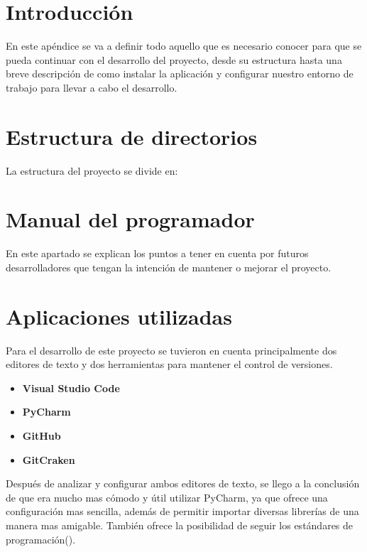 
\section{Introducción}
En este apéndice se va a definir todo aquello que es necesario conocer para que se pueda continuar con el desarrollo del proyecto, desde su estructura hasta una breve descripción de como instalar la aplicación y configurar nuestro entorno de trabajo para llevar a cabo el desarrollo.

\section{Estructura de directorios}
La estructura del proyecto se divide en:

\section{Manual del programador}
En este apartado se explican los puntos a tener en cuenta por futuros desarrolladores que tengan la intención de mantener o mejorar el proyecto.

\section{Aplicaciones utilizadas}
Para el desarrollo de este proyecto se tuvieron en cuenta principalmente dos editores de texto y dos herramientas para mantener el control de versiones.

\begin{itemize}
	\item \textbf{Visual Studio Code} 
	\item \textbf{PyCharm}
	\item \textbf{GitHub}
	\item \textbf{GitCraken}
\end{itemize}
Después de analizar y configurar ambos editores de texto, se llego a la conclusión de que era mucho mas cómodo y útil utilizar PyCharm, ya que ofrece una configuración mas sencilla, además de permitir importar diversas librerías de una manera mas amigable. También ofrece la posibilidad de seguir los estándares de programación(\cite{PEP8}).

